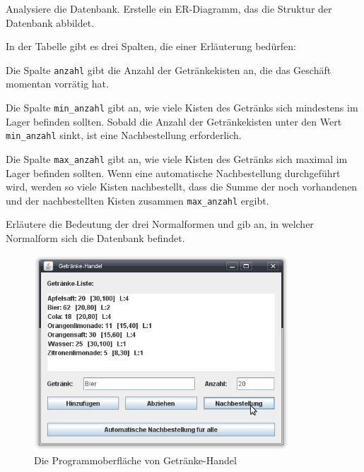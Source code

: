 \begin{compactenum}[a)]
\item Analysiere die Datenbank. Erstelle ein ER-Diagramm, das die Struktur der
Datenbank abbildet.

In der Tabelle  gibt es drei Spalten, die einer Erläuterung
bedürfen:

\begin{compactitem}
\item Die Spalte \verb|anzahl| gibt die Anzahl der Getränkekisten an, die
das Geschäft momentan vorrätig hat.
\item Die Spalte \verb|min_anzahl| gibt an, wie viele Kisten des Getränks sich
mindestens im Lager befinden sollten. Sobald die Anzahl der Getränkekisten
unter den Wert \verb|min_anzahl| sinkt, ist eine Nachbestellung erforderlich.
\item Die Spalte \verb|max_anzahl| gibt an, wie viele Kisten des Getränks sich
maximal im Lager befinden sollten. Wenn eine automatische Nachbestellung durchgeführt
wird, werden so viele Kisten nachbestellt, dass die Summe der noch vorhandenen
und der nachbestellten Kisten zusammen \verb|max_anzahl| ergibt.
\end{compactitem}

\item Erläutere die Bedeutung der drei Normalformen und gib an, in welcher
Normalform sich die Datenbank befindet.

\begin{figure}[h]
 \centering
 \includegraphics[width=0.85\textwidth]{./inf/SEKII/38_JavaSQL_Wiederholung/GetraenkeHandelAufgabe6.png}
 \caption{Die Programmoberfläche von \glqq Getränke-Handel\grqq}
 \label{fig:getraenkehandel}
\end{figure}


\end{compactenum}
